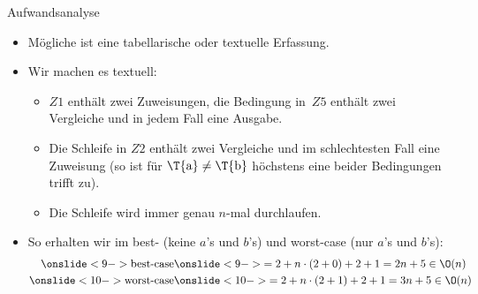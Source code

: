 {\begin{frame}{Aufwandsanalyse}
\begin{itemize}
    \itemsep14pt
    \item<3-> Mögliche ist eine tabellarische oder textuelle Erfassung.
    \item<4-> Wir machen es textuell: \begin{itemize}
        \itemsep7pt
        \item<5-> \(Z1\) enthält zwei Zuweisungen, die Bedingung in~\(Z5\) enthält zwei\\Vergleiche und in jedem Fall eine Ausgabe. %
        \item<6-> Die Schleife in \(Z2\) enthält zwei Vergleiche und im schlechtesten Fall eine Zuweisung (so ist für \(\text{\T{a}} \neq \text{\T{b}}\) höchstens eine beider Bedingungen trifft zu).
        \item<7-> Die Schleife wird immer genau \(n\)-mal durchlaufen.
    \end{itemize}
    \item<8-> So erhalten wir im best- (keine \(a\)'s und \(b\)'s) und worst-case (nur \(a\)'s und \(b\)'s):\vspace*{-3.5mm} \begin{align*}
        \onslide<9->{\text{best-case}} &\onslide<9->{= 2 + n \cdot (2 + 0) + 2 + 1 = 2n + 5 \in \O(n)}\\
        \onslide<10->{\text{worst-case}} &\onslide<10->{= 2 + n \cdot (2 + 1) + 2 + 1 = 3n + 5 \in \O(n)}
    \end{align*}
\end{itemize}
\endtikzpicture
\end{frame}
}


